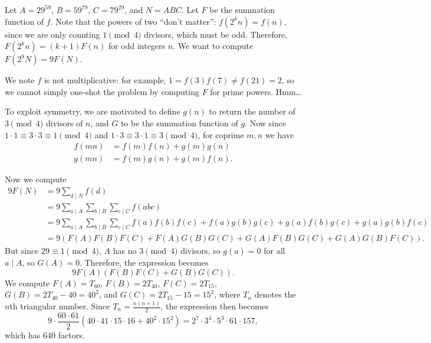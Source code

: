 \documentclass[11pt]{scrartcl}
\begin{document}
\begin{solution}{}
	Let $A = 29^{59}$, $B = 59^{79}$, $C = 79^{29}$, and $N = ABC$. Let $F$ be the summation function of $f$. Note that the powers of two ``don't matter'': $f(2^kn) = f(n)$, since we are only counting $1 \pmod{4}$ divisors, which must be odd. Therefore, $F(2^kn) = (k + 1)F(n)$ for odd integers $n$. We want to compute $F(2^8N) = 9F(N)$.

	We note $f$ is not multiplicative: for example, $1 = f(3)f(7) \neq f(21) = 2$, so we cannot simply one-shot the problem by computing $F$ for prime powers. Hmm\dots

	To exploit symmetry, we are motivated to define $g(n)$ to return the number of $3 \pmod{4}$ divisors of $n$, and $G$ to be the summation function of $g$. Now since $1 \cdot 1 \equiv 3 \cdot 3 \equiv 1 \pmod{4}$ and $1 \cdot 3 \equiv 3 \cdot 1 \equiv 3 \pmod{4}$, for coprime $m,n$ we have
	\begin{align*}
		f(mn) &= f(m)f(n) + g(m)g(n) \\
		g(mn) &= f(m)g(n) + g(m)f(n).
	\end{align*}

	Now we compute
	\begin{align*}
		9F(N) &= 9\sum_{d \mid N}f(d) \\
		&= 9\sum_{a \mid A}\sum_{b \mid B}\sum_{c \mid C}f(abc) \\
		&= 9\sum_{a \mid A}\sum_{b \mid B}\sum_{c \mid C}f(a)f(b)f(c) + f(a)g(b)g(c) + g(a)f(b)g(c) + g(a)g(b)f(c) \\
		&= 9(F(A)F(B)F(C) + F(A)G(B)G(C) + G(A)F(B)G(C) + G(A)G(B)F(C)).
	\end{align*}
	But since $29 \equiv 1 \pmod{4}$, $A$ has no $3 \pmod{4}$ divisors, so $g(a) = 0$ for all $a \mid A$, so $G(A) = 0$. Therefore, the expression becomes
	\[9F(A)(F(B)F(C) + G(B)G(C)).\]
	We compute $F(A) = T_{60}$, $F(B) = 2T_{40}$, $F(C) = 2T_{15}$, $G(B) = 2T_{40} - 40 = 40^2$, and $G(C) = 2T_{15} - 15 = 15^2$, where $T_n$ denotes the $n$th triangular number. Since $T_n = \frac{n(n + 1)}{2}$, the expression then becomes
	\[9 \cdot \frac{60 \cdot 61}{2}\left(40 \cdot 41 \cdot 15 \cdot 16 + 40^2 \cdot 15^2\right) = 2^7 \cdot 3^4 \cdot 5^3 \cdot 61 \cdot 157,\]
	which has $640$ factors.
\end{solution}
\end{document}
